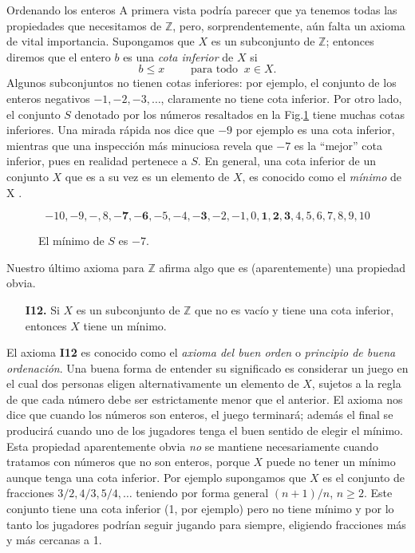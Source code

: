 \documentclass[11pt,spanish,makeidx]{amsbook}
\theoremstyle{definition}
\theoremstyle{remark}
\begin{document}
\begin{section}{Ordenando los enteros}
A primera vista podría parecer que ya tenemos todas las propiedades que necesitamos de $\mathbb Z$, pero, sorprendentemente, aún falta un axioma de vital importancia. Supongamos que $X$ es un subconjunto de $\mathbb Z$; entonces diremos que el entero $b$ es una {\em cota inferior} de $X$ si
$$
b\le x \qquad \text{ para todo } \ x \in X.
$$
Algunos subconjuntos no tienen cotas inferiores: por ejemplo, el conjunto de los enteros negativos $-1,-2,-3,\ldots$, claramente no tiene cota inferior. Por otro lado, el conjunto $S$ denotado por los números resaltados en la Fig.\ref{f1.1} tiene muchas cotas inferiores. Una mirada rápida nos dice que $-9$ por ejemplo es una cota inferior, mientras que una inspección más minuciosa revela que $-7$ es la ``mejor'' cota inferior, pues en realidad pertenece a $S$. En general, una cota inferior de un conjunto $X$ que es a su vez es un elemento de $X$, es conocido como el {\em mínimo} de X .


\begin{figure}[ht]
$$
-10,-9,-,8,\mathbf{-7},\mathbf{-6},-5,-4,\mathbf{-3},-2,-1,0,\mathbf{1},\mathbf{2},\mathbf{3}, 4,5,6,7,8,9,10
$$
\caption{El mínimo de $S$ es $-7$.}\label{f1.1}
\end{figure}

Nuestro último axioma para $\mathbb Z$ afirma algo que es (aparentemente) una propiedad obvia.

\begin{enumerate}
\item[{\bf I12.}] Si $X$ es un subconjunto de $\mathbb Z$ que no es vacío y tiene una cota inferior, entonces $X$ tiene un mínimo.
\end{enumerate}

El axioma {\bf I12} es conocido como el {\em axioma del buen orden} o {\em principio de buena ordenación}.  Una buena forma de entender su significado es considerar un juego en el cual dos personas eligen alternativamente un elemento de $X$, sujetos a la regla de que cada número debe ser estrictamente menor que el anterior. El axioma nos dice que cuando los números son enteros, el juego terminará; además el final se producirá cuando uno de los jugadores tenga el buen sentido de elegir el mínimo. Esta propiedad aparentemente obvia {\it no} se mantiene necesariamente cuando tratamos con números que no son enteros, porque $X$ puede no tener un mínimo aunque tenga una cota inferior. Por ejemplo supongamos que $X$ es el conjunto de fracciones $3/2,4/3,5/4,\ldots$ teniendo por forma general $(n+1)/n$, $n\ge 2$. Este conjunto tiene una cota inferior (1, por ejemplo) pero no tiene mínimo y por lo tanto los jugadores podrían seguir jugando para siempre, eligiendo fracciones más y más cercanas a 1.


\end{section}
\end{document}
